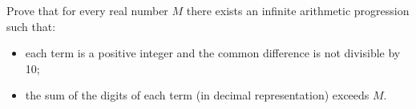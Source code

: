 Prove that for every real number $M$ there exists an infinite arithmetic progression such that:
\begin{itemize}
\item[(i)] each term is a positive integer and the common difference is not divisible by 10;
\item[(ii)] the sum of the digits of each term (in decimal representation) exceeds $M$.
\end{itemize}
